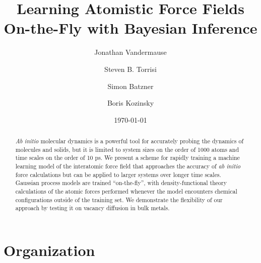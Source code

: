 \documentclass[%
reprint,
superscriptaddress,
amsmath,amssymb,
aps,
prl,
]{revtex4-1}
\begin{document}
\title{Learning Atomistic Force Fields On-the-Fly with Bayesian Inference}

\author{Jonathan Vandermause}

\author{Steven B. Torrisi}

\author{Simon Batzner}

\author{Boris Kozinsky}


\date{\today}

\begin{abstract}
\textit{Ab initio} molecular dynamics is a powerful tool for
accurately probing the dynamics of molecules and solids, but it is limited
to system sizes on the order of 1000 atoms and time scales on the order of
10 ps. We present a scheme for rapidly training a machine learning 
model of the interatomic force field that approaches the accuracy of \textit{ab initio} force calculations but can be applied to larger systems over longer time scales. Gaussian process models are trained “on-the-fly”, with density-functional theory calculations of the atomic forces performed whenever the model encounters chemical configurations outside of the training set. We demonstrate the flexibility of our approach by testing it on vacancy diffusion in bulk metals.
\end{abstract}

\maketitle

\section{Organization}
\end{document}
